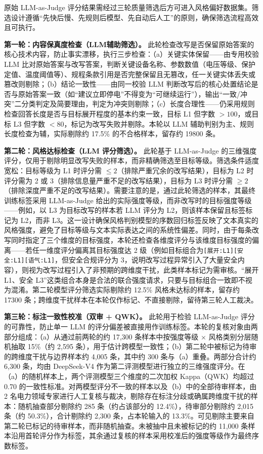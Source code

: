 \documentclass[fontset=fandol,type=master,campus=shenzhen,etitleauto=true]{hithesisbook}
\begin{document}
原始 LLM-as-Judge 评分结果需经过三轮质量筛选后方可进入风格偏好数据集。筛选设计遵循``先快后慢、先规则后模型、先自动后人工''的原则，确保筛选流程高效且可执行。

\textbf{第一轮：内容保真度检查（LLM辅助筛选）。} 此轮检查改写是否保留原始答案的核心技术内容，防止事实漂移，执行三步检查：（a）关键实体保留------由专用校验 LLM 比对原始答案与改写答案，判断关键设备名称、参数数值（电压等级、保护定值、温度阈值等）、规程条款引用是否完整保留且无篡改，任一关键实体丢失或篡改则剔除；（b）结论一致性------由同一校验 LLM 判断改写后的核心处置结论是否与原始答案一致（如``建议立即停电''不得变为``可继续运行''），输出``一致/冲突''二分类判定及简要理由，判定为冲突则剔除；（c）长度合理性------仍采用规则检查回答长度是否与目标展开程度的基本约束一致，目标 L1 但字数 $>100$，或目标 L3 但字数 $<80$，标记为改写失败并剔除。本轮以 LLM 辅助判别为主、规则长度检查为辅，实际剔除约 17.5\% 的不合格样本，留存约 19800 条。

\textbf{第二轮：风格达标检查（LLM 评分筛选）。} 此轮基于 LLM-as-Judge 的三维强度评分，仅用于剔除明显改写失败的样本，而非精确筛选至目标等级。筛选条件适度宽松：目标等级为 L1 时评分需 $\leq 2$（排除严重冗余的改写结果），目标为 L2 时评分需为 2 或 3（排除信息量严重不足的改写结果），目标为 L3 时评分需 $\geq 2$（排除深度严重不足的改写结果）。需要注意的是，通过此轮筛选的样本，其最终训练标签采用 LLM-as-Judge 给出的实际强度等级，而非改写时的目标强度等级------例如，以 L3 为目标改写的样本若 LLM 评分为 L2，则该样本保留且标签标记为 L2，而非 L3。这一设计确保风格判别模型的序数回归标签反映了文本真实的风格强度，避免了目标等级与文本实际表达之间的系统性偏差。同时，由于每条改写同时指定了三个维度的目标强度，本轮还检查各维度评分与该维度目标强度的偏离------若任一维度评分偏离其目标强度达 2 级（例如目标组合为\texttt{[展开:L1][安全:L1][语气:L1]}，但安全合规评分为 3，说明改写过程异常引入了大量安全内容），则视为改写过程引入了非预期的跨维度干扰，此类样本标记为需审核。``展开 L1、安全 L3''这类组合本身是合法的联合强度请求，只要与目标组合一致即不视为混淆。第二轮模型评分筛选实际剔除约 12.5\% 风格未达标的样本，留存约 17300 条；跨维度干扰样本在本轮仅作标记、不直接剔除，留待第三轮人工裁决。

\textbf{第三轮：标注一致性校准（双审 + QWK）。} 此轮用于检验 LLM-as-Judge 评分的可靠性，防止单一 LLM 的评分偏差被直接用作训练标签。本轮的复核对象由两部分组成：（a）从通过前两轮的约 17{,}300 条样本中按强度等级 × 风格类别分层随机抽取 15\%（约 2{,}595 条），用于估计跨模型一致性；（b）第二轮中被标记为待审的跨维度干扰与边界样本约 4{,}005 条，其中约 300 条与（a）重叠。两部分合计约 6{,}300 条，均由 DeepSeek-V4 作为第二评测模型进行独立的三维强度评分。在（a）的随机样本上，两个评测模型三个维度的二次加权 Kappa（QWK）均超过 0.70 的一致性标准。对两模型评分不一致的样本以及（b）中的全部待审样本，由 2 名电力领域专家进行人工复核与裁决，剔除存在标注分歧或确属跨维度干扰的样本：随机抽查部分剔除约 285 条（约占该部分的 12.4\%），待审部分剔除约 2{,}015 条（约 50.3\%），合计剔除约 2{,}300 条，占本轮输入的 13.3\%。可见剔除主要来自第二轮已标记的待审样本，而非随机抽查。未被抽中且未被标记的约 11{,}000 条样本沿用首轮评分作为标签，其余通过复核的样本采用校准后的强度等级作为最终序数标签。
\end{document}
